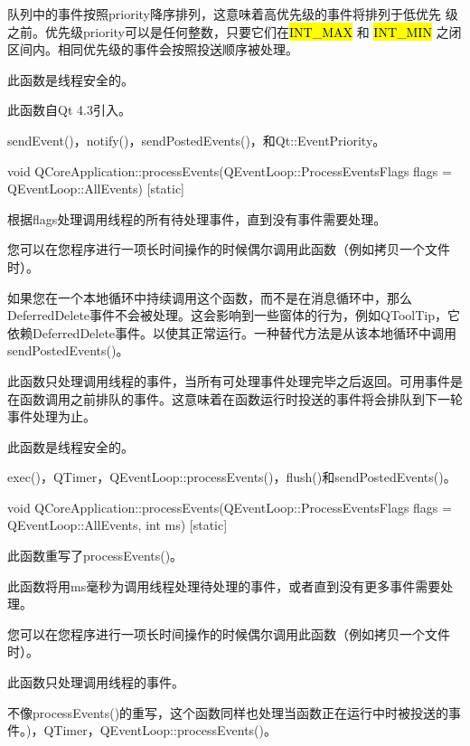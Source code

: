 队列中的事件按照priority降序排列，这意味着高优先级的事件将排列于低优先
级之前。优先级priority可以是任何整数，只要它们在\hl{INT\_MAX} 和
\hl{INT\_MIN} 之闭区间内。相同优先级的事件会按照投送顺序被处理。


\begin{notice}
此函数是线程安全的。
\end{notice}


此函数自Qt 4.3引入。

\begin{notice}[另请参阅]
sendEvent()，notify()，sendPostedEvents()，和Qt::EventPriority。

\end{notice}


void QCoreApplication::processEvents(QEventLoop::ProcessEventsFlags flags = QEventLoop::AllEvents) [static]

根据flags处理调用线程的所有待处理事件，直到没有事件需要处理。

您可以在您程序进行一项长时间操作的时候偶尔调用此函数（例如拷贝一个文件时）。

如果您在一个本地循环中持续调用这个函数，而不是在消息循环中，那么DeferredDelete事件不会被处理。这会影响到一些窗体的行为，例如QToolTip，它依赖DeferredDelete事件。以使其正常运行。一种替代方法是从该本地循环中调用sendPostedEvents()。

此函数只处理调用线程的事件，当所有可处理事件处理完毕之后返回。可用事件是在函数调用之前排队的事件。这意味着在函数运行时投送的事件将会排队到下一轮事件处理为止。


\begin{notice}
此函数是线程安全的。
\end{notice}

\begin{notice}[另请参阅]
exec()，QTimer，QEventLoop::processEvents()，flush()和sendPostedEvents()。
\end{notice}



void QCoreApplication::processEvents(QEventLoop::ProcessEventsFlags
flags = QEventLoop::AllEvents, int ms) [static]

此函数重写了processEvents()。

此函数将用ms毫秒为调用线程处理待处理的事件，或者直到没有更多事件需要处理。

您可以在您程序进行一项长时间操作的时候偶尔调用此函数（例如拷贝一个文件时）。

此函数只处理调用线程的事件。


\begin{notice}
不像processEvents()的重写，这个函数同样也处理当函数正在运行中时被投送的事件。)，QTimer，QEventLoop::processEvents()。
\end{notice}




